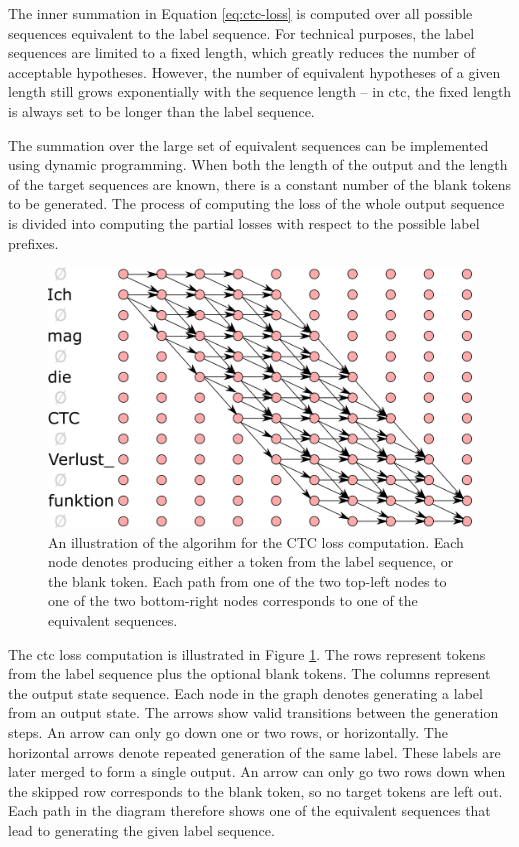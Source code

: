 The inner summation in Equation \ref{eq:ctc-loss} is computed over all possible
sequences equivalent to the label sequence. For technical purposes, the label
sequences are limited to a fixed length, which greatly reduces the number of
acceptable hypotheses. However, the number of equivalent hypotheses of a given
length still grows exponentially with the sequence length -- in \ac{ctc}, the
fixed length is always set to be longer than the label sequence.


The summation over the large set of equivalent sequences can be
implemented using dynamic programming. When both the length of the output and
the length of the target sequences are known, there is a constant number of the
blank tokens to be generated. The process of computing the loss of the whole
output sequence is divided into computing the partial losses with respect to
the possible label prefixes.

\begin{figure}
  \centering

  \includegraphics[width=13cm]{img/ctc_schema.png}

  \caption{An illustration of the algorihm for the CTC loss computation. Each
    node denotes producing either a token from the label sequence, or the blank
    token. Each path from one of the two top-left nodes to one of the two
    bottom-right nodes corresponds to one of the equivalent sequences.  }
  \label{fig:ctc-dynamic-programming}
\end{figure}

The \ac{ctc} loss computation is illustrated in Figure
\ref{fig:ctc-dynamic-programming}. The rows represent tokens from the label
sequence plus the optional blank tokens. The columns represent the output state
sequence.  Each node in the graph denotes generating a label from an output
state. The arrows show valid transitions between the generation steps. An arrow
can only go down one or two rows, or horizontally.  The horizontal arrows
denote repeated generation of the same label. These labels are later merged to
form a single output. An arrow can only go two rows down when the skipped row
corresponds to the blank token, so no target tokens are left out. Each path in
the diagram therefore shows one of the equivalent sequences that lead to
generating the given label sequence.

